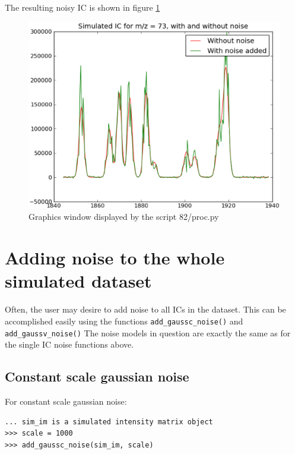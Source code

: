 The resulting noisy IC is shown in figure \ref{fig:gaussv-noise-ic}


\begin{figure}[h]
  \begin{center}
    \includegraphics[scale=0.25]{graphics/chapter10/test-82.eps}
  \end{center}
  \caption{Graphics window displayed by the script 82/proc.py}
  \label{fig:gaussv-noise-ic}
\end{figure}



\section{{Adding noise to the whole simulated dataset}}


Often, the user may desire to add noise to all ICs in the dataset. This can be 
accomplished easily using the functions {\tt add\_gaussc\_noise()} and {\tt add\_gaussv\_noise()}
The noise models in question are exactly the same as for the single IC noise functions above.

\subsection{Constant scale gaussian noise}

For constant scale gaussian noise:

\begin{verbatim}
... sim_im is a simulated intensity matrix object
>>> scale = 1000
>>> add_gaussc_noise(sim_im, scale)
\end{verbatim}

